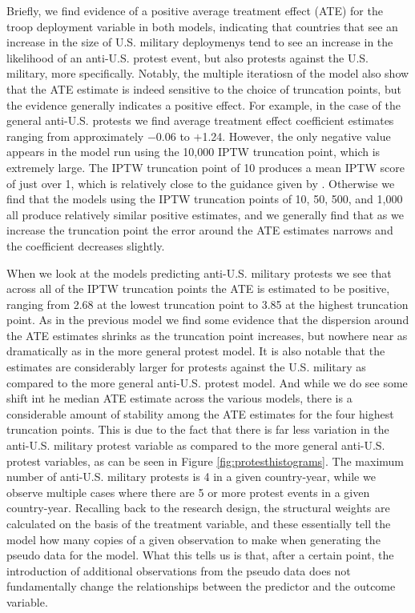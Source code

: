 Briefly, we find evidence of a positive average treatment effect (ATE) for the troop deployment variable in both models, indicating that countries that see an increase in the size of U.S. military deploymenys tend to see an increase in the likelihood of an anti-U.S. protest event, but also protests against the U.S. military, more specifically. Notably, the multiple iteratiosn of the model also show that the ATE estimate is indeed sensitive to the choice of truncation points, but the evidence generally indicates a positive effect. For example, in the case of the general anti-U.S. protests we find average treatment effect coefficient estimates ranging from approximately $-$0.06 to $+$1.24. However, the only negative value appears in the model run using the 10,000 IPTW truncation point, which is extremely large. The IPTW truncation point of 10 produces a mean IPTW score of just over 1, which is relatively close to the guidance given by . Otherwise we find that the models using the IPTW truncation points of 10, 50, 500, and 1,000 all produce relatively similar positive estimates, and we generally find that as we increase the truncation point the error around the ATE estimates narrows and the coefficient decreases slightly. 

When we look at the models predicting anti-U.S. military protests we see that across all of the IPTW truncation points the ATE is estimated to be positive, ranging from 2.68 at the lowest truncation point to 3.85 at the highest truncation point. As in the previous model we find some evidence that the dispersion around the ATE estimates shrinks as the truncation point increases, but nowhere near as dramatically as in the more general protest model. It is also notable that the estimates are considerably larger for protests against the U.S. military as compared to the more general anti-U.S. protest model.  And while we do see some shift int he median ATE estimate across the various models, there is a considerable amount of stability among the ATE estimates for the four highest truncation points. This is due to the fact that there is far less variation in the anti-U.S. military protest variable as compared to the more general anti-U.S. protest variables, as can be seen in Figure \ref{fig:protesthistograms}. The maximum number of anti-U.S. military protests is 4 in a given country-year, while we observe multiple cases where there are 5 or more protest events in a given country-year. Recalling back to the research design, the structural weights are calculated on the basis of the treatment variable, and these essentially tell the model how many copies of a given observation to make when generating the pseudo data for the model. What this tells us is that, after a certain point, the introduction of additional observations from the pseudo data does not fundamentally change the relationships between the predictor and the outcome variable.

